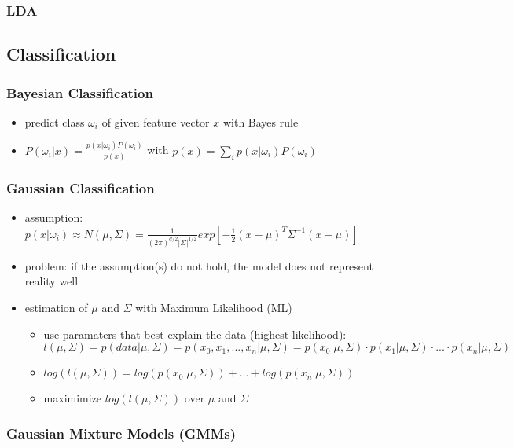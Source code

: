 \documentclass[paper=a4, fontsize=11pt]{scrartcl} %
\numberwithin{equation}{section} %
\numberwithin{figure}{section} %
\numberwithin{table}{section} %
\begin{document}
\subsubsection{LDA}

\subsection{Classification}

\subsubsection{Bayesian Classification}

\begin{itemize}
\item predict class $\omega_i$ of given feature vector $x$ with Bayes rule
\item $P(\omega_i|x) = \frac{p(x|\omega_i)P(\omega_i)}{p(x)}$ with $p(x) = \sum\limits_i p(x|\omega_i) P(\omega_i)$
\end{itemize}

\subsubsection{Gaussian Classification}

\begin{itemize}
\item assumption: $p(x|\omega_i) \approx N(\mu, \Sigma) = \frac{1}{(2\pi)^{d/2}|\Sigma|^{1/2}} exp[-\frac{1}{2}(x-\mu)^T \Sigma^{-1} (x-\mu)]$
\item problem: if the assumption(s) do not hold, the model does not represent reality well
\item estimation of $\mu$ and $\Sigma$ with Maximum Likelihood (ML)
\begin{itemize}
\item use paramaters that best explain the data (highest likelihood): $l(\mu,\Sigma) = p(data|\mu,\Sigma) = p(x_0,x_1,...,x_n|\mu,\Sigma) = p(x_0|\mu,\Sigma) \cdot p(x_1|\mu,\Sigma) \cdot ... \cdot p(x_n|\mu,\Sigma)$
\item $log(l(\mu,\Sigma)) = log(p(x_0|\mu, \Sigma)) + ... + log(p(x_n|\mu, \Sigma))$
\item maximimize $log(l(\mu,\Sigma))$ over $\mu$ and $\Sigma$
\end{itemize}
\end{itemize}

\subsubsection{Gaussian Mixture Models (GMMs)}
\end{document}
